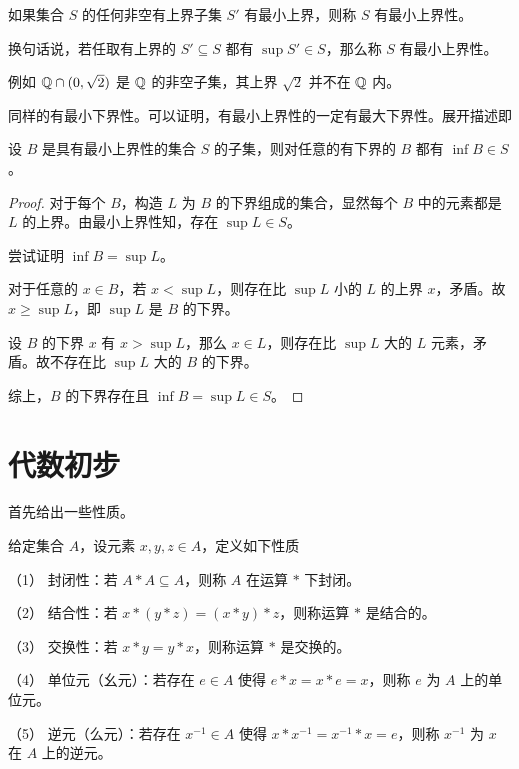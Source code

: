 \begin{definition}[最小上界性]
	如果集合 $S$ 的任何非空有上界子集 $S'$ 有最小上界，则称 $S$ 有最小上界性。

	换句话说，若任取有上界的 $S' \subseteq S$ 都有 $\sup S' \in S$，那么称 $S$ 有最小上界性。
\end{definition}



例如 $\mathbb{Q} \cap (0,\sqrt2)$ 是 $\mathbb{Q}$ 的非空子集，其上界 $\sqrt2$ 并不在 $\mathbb{Q}$ 内。

同样的有最小下界性。可以证明，有最小上界性的一定有最大下界性。展开描述即

\begin{theorem}
	设 $B$ 是具有最小上界性的集合 $S$ 的子集，则对任意的有下界的 $B$ 都有 $\inf B \in S$。
\end{theorem}

\begin{proof}
	对于每个 $B$，构造 $L$ 为 $B$ 的下界组成的集合，显然每个 $B$ 中的元素都是 $L$ 的上界。由最小上界性知，存在 $\sup L \in S$。

	尝试证明 $\inf B=\sup L$。

	对于任意的 $x\in B$，若 $x<\sup L$，则存在比 $\sup L$ 小的 $L$ 的上界 $x$，矛盾。故 $x \geqslant \sup L$，即 $\sup L$ 是 $B$ 的下界。

	设 $B$ 的下界 $x$ 有 $x>\sup L$，那么 $x\in L$，则存在比 $\sup L$ 大的 $L$ 元素，矛盾。故不存在比 $\sup L$ 大的 $B$ 的下界。

	综上，$B$ 的下界存在且 $\inf B=\sup L \in S$。
\end{proof}

\section{代数初步}

首先给出一些性质。

\begin{definition}
	给定集合 $A$，设元素 $x, y, z \in A$，定义如下性质

	（1） 封闭性：若 $A \ast A \subseteq A$，则称 $A$ 在运算 $\ast$ 下封闭。

	（2） 结合性：若 $x \ast (y \ast z) = (x \ast y) \ast z$，则称运算 $\ast$ 是结合的。

	（3） 交换性：若 $x \ast y = y \ast x$，则称运算 $\ast$ 是交换的。

	（4） 单位元（幺元）：若存在 $e \in A$ 使得 $e \ast x = x \ast e = x$，则称 $e$ 为 $A$ 上的单位元。

	（5） 逆元（么元）：若存在 $x^{-1} \in A$ 使得 $x \ast x^{-1} = x^{-1} \ast x = e$，则称 $x^{-1}$ 为 $x$ 在 $A$ 上的逆元。
\end{definition}

